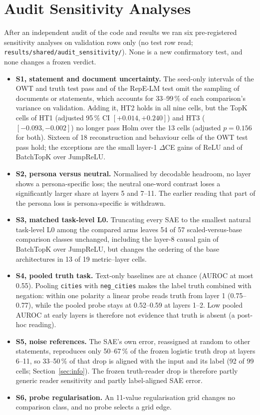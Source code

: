 \section{Audit Sensitivity Analyses}\label{sec:audit}

After an independent audit of the code and results we ran six pre-registered sensitivity analyses on validation rows
only (no test row read; \texttt{results/\allowbreak{}shared/\allowbreak{}audit\_sensitivity/}). None is a new
confirmatory test, and none changes a frozen verdict.
\begin{itemize}
  \item \textbf{S1, statement and document uncertainty.} The seed-only intervals of the OWT and truth test pass and of
        the RepE-LM test omit the sampling of documents or statements, which accounts for 33--99\,\% of each
        comparison's variance on validation. Adding it, HT2 holds in all nine cells, but the TopK cells of HT1 (adjusted
        95\,\% CI $[+0.014, +0.240]$) and HT3 ($[-0.093, -0.002]$) no longer pass Holm over the 13 cells (adjusted
        $p=0.156$ for both). Sixteen of 18 reconstruction and behaviour cells of the OWT test pass hold; the exceptions
        are the small layer-1 $\Delta$CE gains of ReLU and of BatchTopK over JumpReLU.
  \item \textbf{S2, persona versus neutral.} Normalised by decodable headroom, no layer shows a persona-specific loss;
        the neutral one-word contrast loses a significantly larger share at layers 5 and 7--11. The earlier reading that
        part of the persona loss is persona-specific is withdrawn.
  \item \textbf{S3, matched task-level L0.} Truncating every SAE to the smallest natural task-level L0 among the
        compared arms leaves 54 of 57 scaled-versus-base comparison classes unchanged, including the layer-8 causal gain
        of BatchTopK over JumpReLU, but changes the ordering of the base architectures in 13 of 19 metric--layer cells.
  \item \textbf{S4, pooled truth task.} Text-only baselines are at chance (AUROC at most 0.55). Pooling
        \texttt{cities} with \texttt{neg\_cities} makes the label truth combined with negation: within one polarity a
        linear probe reads truth from layer 1 (0.75--0.77), while the pooled probe stays at 0.52--0.59 at layers 1--2.
        Low pooled AUROC at early layers is therefore not evidence that truth is absent (a post-hoc reading).
  \item \textbf{S5, noise references.} The SAE's own error, reassigned at random to other statements, reproduces only
        50--67\,\% of the frozen logistic truth drop at layers 6--11, so 33--50\,\% of that drop is aligned with the
        input and its label (92 of 99 cells; Section~\ref{sec:info}). The frozen truth-reader drop is therefore partly
        generic reader sensitivity and partly label-aligned SAE error.
  \item \textbf{S6, probe regularisation.} An 11-value regularisation grid changes no comparison class, and no probe
        selects a grid edge.
\end{itemize}

